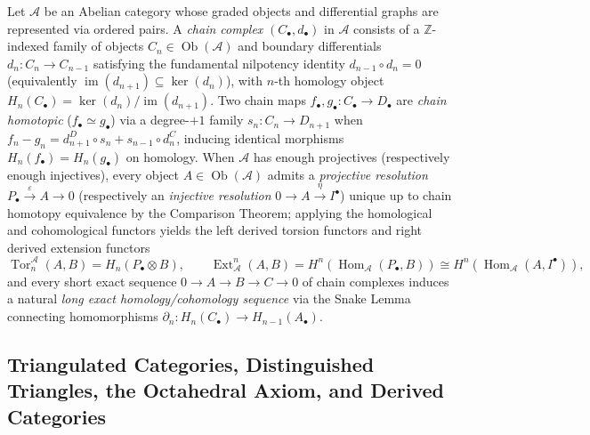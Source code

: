 Let $\mathcal{A}$ be an Abelian category whose graded objects and differential graphs are represented via ordered pairs. A \emph{chain complex} $(C_\bullet, d_\bullet)$ in $\mathcal{A}$ consists of a $\mathbb{Z}$-indexed family of objects $C_n \in \operatorname{Ob}(\mathcal{A})$ and boundary differentials $d_n\colon C_n \to C_{n-1}$ satisfying the fundamental nilpotency identity $d_{n-1} \circ d_n = 0$ (equivalently $\operatorname{im}(d_{n+1}) \subseteq \ker(d_n)$), with $n$-th homology object $H_n(C_\bullet) = \ker(d_n)/\operatorname{im}(d_{n+1})$. Two chain maps $f_\bullet, g_\bullet\colon C_\bullet \to D_\bullet$ are \emph{chain homotopic} ($f_\bullet \simeq g_\bullet$) via a degree-$+1$ family $s_n\colon C_n \to D_{n+1}$ when $f_n - g_n = d^D_{n+1} \circ s_n + s_{n-1} \circ d^C_n$, inducing identical morphisms $H_n(f_\bullet) = H_n(g_\bullet)$ on homology. When $\mathcal{A}$ has enough projectives (respectively enough injectives), every object $A \in \operatorname{Ob}(\mathcal{A})$ admits a \emph{projective resolution} $P_\bullet \xrightarrow{\varepsilon} A \to 0$ (respectively an \emph{injective resolution} $0 \to A \xrightarrow{\eta} I^\bullet$) unique up to chain homotopy equivalence by the Comparison Theorem; applying the homological and cohomological functors yields the left derived torsion functors and right derived extension functors
\[
\operatorname{Tor}_n^{\mathcal{A}}(A, B) = H_n(P_\bullet \otimes B), \qquad
\operatorname{Ext}^n_{\mathcal{A}}(A, B) = H^n(\operatorname{Hom}_{\mathcal{A}}(P_\bullet, B)) \cong H^n(\operatorname{Hom}_{\mathcal{A}}(A, I^\bullet)),
\]
and every short exact sequence $0 \to A \to B \to C \to 0$ of chain complexes induces a natural \emph{long exact homology/cohomology sequence} via the Snake Lemma connecting homomorphisms $\partial_n\colon H_n(C_\bullet) \to H_{n-1}(A_\bullet)$.

\subsection{Triangulated Categories, Distinguished Triangles, the Octahedral Axiom, and Derived Categories}
\label{subsec:triangulated_categories_octahedral_derived_categories}

